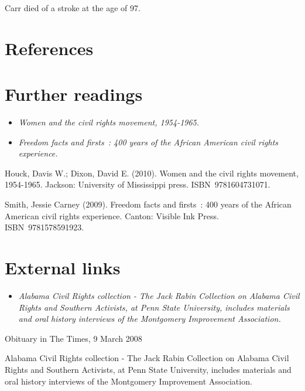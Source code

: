 Carr died of a stroke at the age of 97.

\section{References}\label{references}

\section{Further readings}\label{further-readings}

\begin{itemize}
\item
  \emph{Women and the civil rights movement, 1954-1965.}
\item
  \emph{Freedom facts and firsts~: 400 years of the African American
  civil rights experience.}
\end{itemize}

Houck, Davis W.; Dixon, David E. (2010). Women and the civil rights
movement, 1954-1965. Jackson: University of Mississippi press.
ISBN~9781604731071.

Smith, Jessie Carney (2009). Freedom facts and firsts~: 400 years of the
African American civil rights experience. Canton: Visible Ink Press.
ISBN~9781578591923.

\section{External links}\label{external-links}

\begin{itemize}
\item
  \emph{Alabama Civil Rights collection - The Jack Rabin Collection on
  Alabama Civil Rights and Southern Activists, at Penn State University,
  includes materials and oral history interviews of the Montgomery
  Improvement Association.}
\end{itemize}

Obituary in The Times, 9 March 2008

Alabama Civil Rights collection - The Jack Rabin Collection on Alabama
Civil Rights and Southern Activists, at Penn State University, includes
materials and oral history interviews of the Montgomery Improvement
Association.
